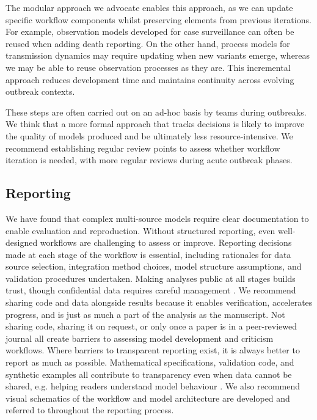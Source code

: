 \documentclass{article}
\begin{document}
The modular approach we advocate enables this approach, as we can update specific workflow components whilst preserving elements from previous iterations.
For example, observation models developed for case surveillance can often be reused when adding death reporting. On the other hand, process models for transmission dynamics may require updating when new variants emerge, whereas we may be able to reuse observation processes as they are.
This incremental approach reduces development time and maintains continuity across evolving outbreak contexts.

These steps are often carried out on an ad-hoc basis by teams during outbreaks.
We think that a more formal approach that tracks decisions is likely to improve the quality of models produced and be ultimately less resource-intensive.
We recommend establishing regular review points to assess whether workflow iteration is needed, with more regular reviews during acute outbreak phases.

\subsection{Reporting} \label{sec:reporting}
We have found that complex multi-source models require clear documentation to enable evaluation and reproduction.
Without structured reporting, even well-designed workflows are challenging to assess or improve.
Reporting decisions made at each stage of the workflow is essential, including rationales for data source selection, integration method choices, model structure assumptions, and validation procedures undertaken.
Making analyses public at all stages builds trust, though confidential data requires careful management \citep{Abbott2021-delta, Abbott2022-prevalence}. 
We recommend sharing code and data alongside results because it enables verification, accelerates progress, and is just as much a part of the analysis as the manuscript.
Not sharing code, sharing it on request, or only once a paper is in a peer-reviewed journal all create barriers to assessing model development and criticism workflows.
Where barriers to transparent reporting exist, it is always better to report as much as possible.
Mathematical specifications, validation code, and synthetic examples all contribute to transparency even when data cannot be shared, e.g. helping readers understand model behaviour \citep{Mellor2025-norovirus}.
We also recommend visual schematics of the workflow and model architecture are developed and referred to throughout the reporting process.
\end{document}
